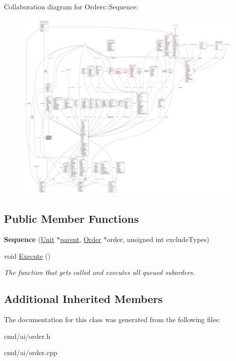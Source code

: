 Collaboration diagram for Orders\+:\+:Sequence\+:
\nopagebreak
\begin{figure}[H]
\begin{center}
\leavevmode
\includegraphics[width=350pt]{d3/d79/classOrders_1_1Sequence__coll__graph}
\end{center}
\end{figure}
\subsection*{Public Member Functions}
\begin{DoxyCompactItemize}
\item 
{\bfseries Sequence} (\hyperlink{classUnit}{Unit} $\ast$\hyperlink{classOrder_a57548b2476945f89ac22fafa4cb5863b}{parent}, \hyperlink{classOrder}{Order} $\ast$order, unsigned int exclude\+Types)\hypertarget{classOrders_1_1Sequence_a7b629505c922b8e6652583b4ed18b986}{}\label{classOrders_1_1Sequence_a7b629505c922b8e6652583b4ed18b986}

\item 
void \hyperlink{classOrders_1_1Sequence_ae0a2e82e73e1256f5d01c9426723ec23}{Execute} ()\hypertarget{classOrders_1_1Sequence_ae0a2e82e73e1256f5d01c9426723ec23}{}\label{classOrders_1_1Sequence_ae0a2e82e73e1256f5d01c9426723ec23}

\begin{DoxyCompactList}\small\item\em The function that gets called and executes all queued suborders. \end{DoxyCompactList}\end{DoxyCompactItemize}
\subsection*{Additional Inherited Members}


The documentation for this class was generated from the following files\+:\begin{DoxyCompactItemize}
\item 
cmd/ai/order.\+h\item 
cmd/ai/order.\+cpp\end{DoxyCompactItemize}
